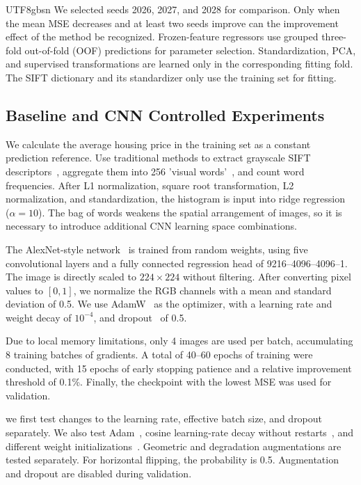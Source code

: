 \documentclass[conference,a4paper]{IEEEtran}
\begin{document}
\begin{CJK*}{UTF8}{gbsn}
We selected seeds 2026, 2027, and 2028 for comparison. Only when the mean MSE decreases and at least two seeds improve can the improvement effect of the method be recognized. Frozen-feature regressors use grouped three-fold out-of-fold (OOF) predictions for parameter selection. Standardization, PCA, and supervised transformations are learned only in the corresponding fitting fold. The SIFT dictionary and its standardizer only use the training set for fitting.

\subsection{Baseline and CNN Controlled Experiments}
We calculate the average housing price in the training set as a constant prediction reference. Use traditional methods to extract grayscale SIFT descriptors~\cite{sift1999,sift}, aggregate them into 256 'visual words'~\cite{bovw}, and count word frequencies. After L1 normalization, square root transformation, L2 normalization, and standardization, the histogram is input into ridge regression~\cite{ridge} ($\alpha=10$). The bag of words weakens the spatial arrangement of images, so it is necessary to introduce additional CNN learning space combinations.

The AlexNet-style network~\cite{alexnet} is trained from random weights, using five convolutional layers and a fully connected regression head of 9216--4096--4096--1. The image is directly scaled to $224\times224$ without filtering. After converting pixel values to $[0,1]$, we normalize the RGB channels with a mean and standard deviation of 0.5. We use AdamW~\cite{adamw} as the optimizer, with a learning rate and weight decay of $10^{-4}$, and dropout~\cite{dropout2012,dropout} of 0.5.

Due to local memory limitations, only 4 images are used per batch, accumulating 8 training batches of gradients. A total of 40--60 epochs of training were conducted, with 15 epochs of early stopping patience and a relative improvement threshold of 0.1\%. Finally, the checkpoint with the lowest MSE was used for validation.

we first test changes to the learning rate, effective batch size, and dropout separately. We also test Adam~\cite{adam}, cosine learning-rate decay without restarts~\cite{sgdr}, and different weight initializations~\cite{xavier,heinit}. Geometric and degradation augmentations are tested separately. For horizontal flipping, the probability is 0.5. Augmentation and dropout are disabled during validation.


\end{CJK*}
\end{document}
